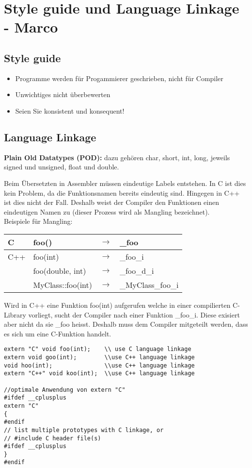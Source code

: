 \section{Style guide und Language Linkage - Marco}
\subsection{Style guide}
\begin{itemize}
	\item Programme werden für Progammierer geschrieben, nicht für Compiler
	\item Unwichtiges nicht überbewerten
	\item Seien Sie konsistent und konsequent!
\end{itemize}


\subsection{Language Linkage}
  \textbf{Plain Old Datatypes (POD):} dazu gehören char, short, int, long, jeweils signed und unsigned, float und double.
  
  Beim Übersetzten in Assembler müssen eindeutige Labels entstehen. In C ist dies kein Problem,
  da die Funktionsnamen bereits eindeutig sind. Hingegen in C++ ist dies nicht der Fall. Deshalb weist der
  Compiler den Funktionen einen eindeutigen Namen zu (dieser Prozess wird als Mangling bezeichnet).\\
  
  Beispiele für Mangling:\\
  \begin{tabular}{|l|lll|}
  \hline
    C   & foo() & $\rightarrow$ & \_foo \\
  \hline
    C++ & foo(int) & $\rightarrow$ & \_foo\_i \\
        & foo(double, int) & $\rightarrow$ & \_foo\_d\_i \\
        & MyClass::foo(int) & $\rightarrow$ & \_MyClass\_foo\_i \\
  \hline
  \end{tabular}
  
  Wird in C++ eine Funktion foo(int) aufgerufen welche in einer compilierten C-Library vorliegt, sucht der
  Compiler nach einer Funktion \_foo\_i. Diese exisiert aber nicht da sie \_foo heisst. Deshalb muss dem Compiler
  mitgeteilt werden, dass es sich um eine C-Funktion handelt.\\
  
\begin{lstlisting}[style=Cpp]
extern "C" void foo(int);    \\ use C language linkage
extern void goo(int);        \\use C++ language linkage
void hoo(int);               \\use C++ language linkage
extern "C++" void koo(int);  \\use C++ language linkage

//optimale Anwendung von extern "C"
#ifdef __cplusplus
extern "C"
{
#endif
// list multiple prototypes with C linkage, or
// #include C header file(s)
#ifdef __cplusplus
}
#endif
\end{lstlisting}
